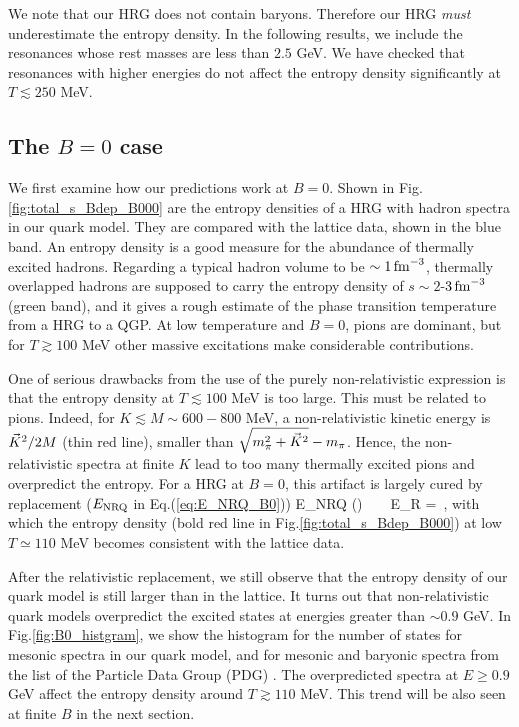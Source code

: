 We note that our HRG does not contain baryons.
Therefore our HRG {\it must} underestimate the entropy density.
In the following results, we include the resonances whose rest masses are less than $2.5$ GeV. 
We have checked that resonances with higher energies do not affect the entropy density significantly at $T\lesssim 250$ MeV.

\subsection{The $B=0$ case }
\label{sec:HRG_B0}

We first examine how our predictions work at $B=0$.
Shown in Fig.\ref{fig:total_s_Bdep_B000} are the entropy densities of a HRG with hadron spectra in our quark model.
They are compared with the lattice data, shown in the blue band.
An entropy density is a good measure for the abundance of thermally excited hadrons. 
Regarding a typical hadron volume to be $\sim 1\,{\rm fm}^{-3}$, thermally overlapped hadrons 
are supposed to carry the entropy density of $s \sim 2$-$3\,{\rm fm}^{-3}$ (green band), 
and it gives a rough estimate of the phase transition temperature from a HRG to a QGP. 
At low temperature and $B=0$, pions are dominant, but for $T \gtrsim 100$ MeV other massive excitations make considerable contributions. 


One of serious drawbacks from the use of the purely non-relativistic expression is that the entropy density at $T \lesssim 100$ MeV is too large.
This must be related to pions.
Indeed, 
for $K \lesssim M \sim 600-800$ MeV, a non-relativistic kinetic energy is $\vec{K}^2/2M$ (thin red line), smaller than $\sqrt{m_\pi^2+\vec{K}^2} - m_\pi$.
Hence, the non-relativistic spectra at finite $K$ lead to too many thermally excited pions and overpredict the entropy.
For a HRG at $B=0$, this artifact is largely cured by replacement ($E_{\rm NRQ}$ in Eq.(\ref{eq:E_NRQ_B0}))
%
\beq
E_{\rm NRQ} (\vK) ~ \rightarrow ~ E_{\rm R} =  \,,
\eeq
%
with which the entropy density (bold red line in Fig.\ref{fig:total_s_Bdep_B000}) at low $T\simeq 110$ MeV  becomes consistent with the lattice data.

After the relativistic replacement, we still observe that the entropy density of our quark model is still larger than in the lattice.
It turns out that non-relativistic quark models overpredict the excited states at energies greater than $\sim 0.9$ GeV. 
In Fig.\ref{fig:B0_histgram}, we show the histogram for the number of states for mesonic spectra in our quark model, 
and for mesonic and baryonic spectra from the list of the Particle Data Group (PDG)  \cite{ParticleDataGroup:2020ssz}.
The overpredicted spectra at $E \ge 0.9$ GeV affect the entropy density around $T\gtrsim 110$ MeV.
This trend will be also seen at finite $B$ in the next section.




